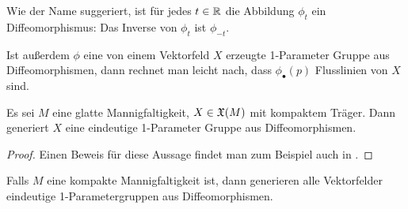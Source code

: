 \begin{remark}
    Wie der Name suggeriert, ist für jedes $t \in { \mathbb R }$ die Abbildung $\phi_t$ ein 
    Diffeomorphismus: Das Inverse von $\phi_t$ ist $\phi_{-t}$.

    Ist außerdem $\phi$ eine von einem Vektorfeld $X$ erzeugte 1-Parameter Gruppe aus 
    Diffeomorphismen, dann rechnet man leicht nach, dass $\phi_{\bullet}(p)$ Flusslinien 
    von $X$ sind.
\end{remark}

\begin{prop}
    \label{prop: kompaktes VF generiert 1-param. grp.}
    Es sei $M$ eine glatte Mannigfaltigkeit, $X \in { \mathfrak{X} } (M)$ mit kompaktem Träger. Dann 
    generiert $X$ eine eindeutige 1-Parameter Gruppe aus Diffeomorphismen.
\end{prop}

\begin{proof}
    Einen Beweis für diese Aussage findet man zum Beispiel auch in \cite{milnor}.
\end{proof}

\begin{remark}
    Falls $M$ eine kompakte Mannigfaltigkeit ist, dann generieren alle Vektorfelder eindeutige 
    1-Parametergruppen aus Diffeomorphismen.
\end{remark}




